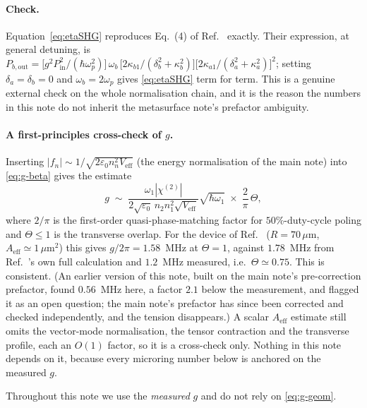 \documentclass[11pt,a4paper]{article}
\newcommand{\eps}{\varepsilon}
\newcommand{\chitwo}{\chi^{(2)}}
\newcommand{\Veff}{V_{\text{eff}}}
\newcommand{\Aeff}{A_{\text{eff}}}
\begin{document}
\paragraph{Check.}  Equation~\eqref{eq:etaSHG} reproduces Eq.~(4) of
Ref.~\cite{Lu2020} exactly.  Their expression, at general detuning, is
$P_{b,\text{out}}=\bigl[g^2P_{\text{in}}^2/(\hbar\omega_p^2)\bigr]\,\omega_b\,
 \bigl[2\kappa_{b1}/(\delta_b^2+\kappa_b^2)\bigr]
 \bigl[2\kappa_{a1}/(\delta_a^2+\kappa_a^2)\bigr]^2$;
setting $\delta_a=\delta_b=0$ and $\omega_b=2\omega_p$ gives
\eqref{eq:etaSHG} term for term.  This is a genuine external check on
the whole normalisation chain, and it is the reason the numbers in this
note do not inherit the metasurface note's prefactor ambiguity.

\paragraph{A first-principles cross-check of $g$.}  Inserting
$|f_n|\sim1/\sqrt{2\eps_0n_n^2\Veff}$ (the energy normalisation of the
main note) into \eqref{eq:g-beta} gives the estimate
\begin{equation}
  g\;\sim\;\frac{\omega_1|\chitwo|}{2\sqrt{\eps_0}\,n_2n_1^2\sqrt{\Veff}}
          \sqrt{\hbar\omega_1}\;\times\;\frac{2}{\pi}\,\Theta ,
  \label{eq:g-geom}
\end{equation}
where $2/\pi$ is the first-order quasi-phase-matching factor for
$50\%$-duty-cycle poling and $\Theta\le1$ is the transverse overlap.
For the device of Ref.~\cite{Lu2020} ($R=70\,\mu$m, $\Aeff\simeq1\,\mu$m$^2$)
this gives $g/2\pi=1.58$~MHz at $\Theta=1$, against $1.78$~MHz from
Ref.~\cite{Lu2020}'s own full calculation and $1.2$~MHz measured, i.e.\
$\Theta\simeq0.75$.  This is consistent.  (An earlier version of this
note, built on the main note's pre-correction prefactor, found $0.56$~MHz
here, a factor $2.1$ below the measurement, and flagged it as an open
question; the main note's prefactor has since been corrected and checked
independently, and the tension disappears.)  A scalar $\Aeff$ estimate
still omits the vector-mode normalisation, the tensor contraction and the
transverse profile, each an $O(1)$ factor, so it is a cross-check only.
Nothing in this note depends on it, because every microring number below
is anchored on the measured $g$.

Throughout this note we use the \emph{measured} $g$ and do not rely on
\eqref{eq:g-geom}.
\end{document}
